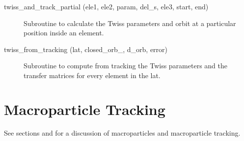 \begin{description}
\item[twiss_and_track_partial (ele1, ele2, param, del_s, ele3, start, end)] \Newline
Subroutine to calculate the Twiss parameters and orbit at a particular position inside an element. 

\item[twiss_from_tracking (lat, closed_orb_, d_orb, error)] \Newline
Subroutine to compute from tracking the Twiss parameters and the transfer matrices 
for every element in the lat. 

\end{description}

\section{Macroparticle Tracking}
\label{r:macro}    

See sections  and  for a discussion of macroparticles
and macroparticle tracking.

